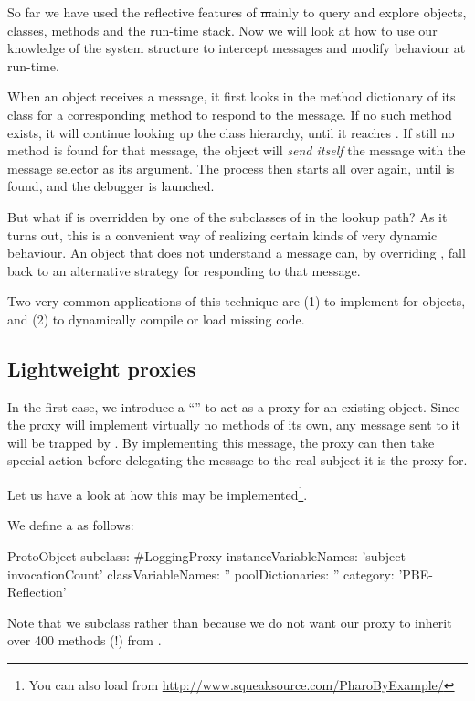 \documentclass[a4paper,10pt,twoside]{book}
\begin{document}
{So far we have used the reflective features of \st mainly to query and explore objects, classes, methods and the run-time stack. Now we will look at how to use our knowledge of the \st system structure to intercept messages and modify behaviour at run-time.

When an object receives a message, it first looks in the method dictionary of its class for a corresponding method to respond to the message.
If no such method exists, it will continue looking up the class hierarchy, until it reaches . If still no method is found for that message, the object will \emph{send itself} the message  with the message selector as its argument.
The process then starts all over again, until  is found, and the debugger is launched.

But what if  is overridden by one of the subclasses of  in the lookup path?
As it turns out, this is a convenient way of realizing certain kinds of very dynamic behaviour. An object that does not understand a message can, by overriding , fall back to an alternative strategy for responding to that message.

Two very common applications of this technique are (1) to implement  for objects, and (2) to dynamically compile or load missing code.

\subsection{Lightweight proxies}

In the first case, we introduce a ``'' to act as a proxy for an existing object.
Since the proxy will implement virtually no methods of its own, any message sent to it will be trapped by . By implementing this message, the proxy can then take special action before delegating the message to the real subject it is the proxy for.

Let us have a look at how this may be implemented\footnote{You can also load  from \url{http://www.squeaksource.com/PharoByExample/}}.

We define a  as follows:
\begin{code}{}
ProtoObject subclass: #LoggingProxy
	instanceVariableNames: 'subject invocationCount'
	classVariableNames: ''
	poolDictionaries: ''
	category: 'PBE-Reflection'
\end{code}
Note that we subclass  rather than  because we do not want our proxy to inherit over 400 methods (!) from .

}
\end{document}
